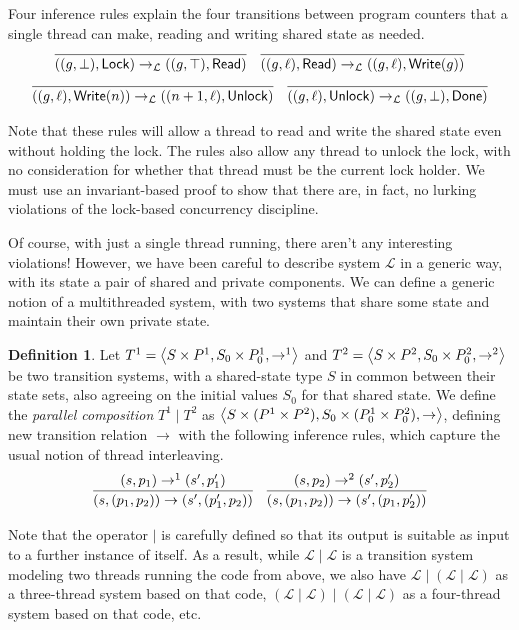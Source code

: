 \documentclass{amsbook}
\theoremstyle{definition}
\newtheorem{definition}[theorem]{Definition}
\theoremstyle{remark}
\numberwithin{section}{chapter}
\numberwithin{equation}{chapter}
\begin{document}
Four inference rules explain the four transitions between program counters that a single thread can make, reading and writing shared state as needed.
$$\infer{((g, \bot), \mathsf{Lock}) \to_{\mathcal L} ((g, \top), \mathsf{Read})}{}
\quad \infer{((g, \ell), \mathsf{Read}) \to_{\mathcal L} ((g, \ell), \mathsf{Write}(g))}{}$$
$$\infer{((g, \ell), \mathsf{Write}(n)) \to_{\mathcal L} ((n+1, \ell), \mathsf{Unlock})}{}
\quad \infer{((g, \ell), \mathsf{Unlock}) \to_{\mathcal L} ((g, \bot), \mathsf{Done})}{}$$

\smallskip

Note that these rules will allow a thread to read and write the shared state even without holding the lock.
The rules also allow any thread to unlock the lock, with no consideration for whether that thread must be the current lock holder.
We must use an invariant-based proof to show that there are, in fact, no lurking violations of the lock-based concurrency discipline.

Of course, with just a single thread running, there aren't any interesting violations!
However, we have been careful to describe system $\mathcal L$ in a generic way, with its state a pair of shared and private components.
We can define a generic notion of a multithreaded system, with two systems that share some state and maintain their own private state.

\encoding
\begin{definition}
  Let $T^1 = {\left \langle S \times P^1, S_0 \times P^1_0, \to^1 \right \rangle}$ and $T^2 = {\left \langle S \times P^2, S_0 \times P^2_0, \to^2 \right \rangle}$ be two transition systems, with a shared-state type $S$ in common between their state sets, also agreeing on the initial values $S_0$ for that shared state.  We define the \emph{parallel composition} $T^1 \mid T^2$ as ${\left \langle S \times (P^1 \times P^2), S_0 \times (P^1_0 \times P^2_0), \to \right \rangle}$, defining new transition relation $\to$ with the following inference rules, which capture the usual notion of thread interleaving.
  $$\infer{(s, (p_1, p_2)) \to (s', (p'_1, p_2))}{
    (s, p_1) \to^1 (s', p'_1)
  }
  \quad \infer{(s, (p_1, p_2)) \to (s', (p_1, p'_2))}{
    (s, p_2) \to^2 (s', p'_2)
  }$$
\end{definition}

Note that the operator $\mid$ is carefully defined so that its output is suitable as input to a further instance of itself.
As a result, while $\mathcal L \mid \mathcal L$ is a transition system modeling two threads running the code from above, we also have $\mathcal L \mid (\mathcal L \mid \mathcal L)$ as a three-thread system based on that code, $(\mathcal L \mid \mathcal L) \mid (\mathcal L \mid \mathcal L)$ as a four-thread system based on that code, etc.
\end{document}
